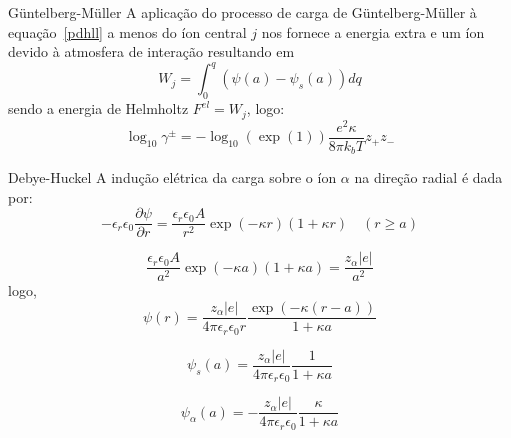 \documentclass{beamer}
\begin{document}
\begin{frame}{G\"{u}ntelberg-M\"{u}ller}
	  A aplicação do processo de carga de G\"{u}ntelberg-M\"{u}ller à  equação~\ref{pdhll} a menos do íon central $j$
	  nos fornece a energia extra e um íon devido à atmosfera de interação resultando em 
	  \begin{equation}
		  W_j = \int^{q}_{0} (\psi(a)- \psi_s(a))dq
	  \end{equation}
            sendo a energia de Helmholtz  $F^{el} = W_j$, logo: 
	\begin{equation}
		\log_{10} \gamma^{\pm} = -\log_{10}(\exp(1)) \frac{e^2 \kappa }{8 \pi k_b T}z_{+}z_{-}
	\end{equation}

%
\end{frame}

\begin{frame}{Debye-Huckel}
A indução elétrica da carga sobre o íon $\alpha$ na direção radial é dada por:
	\begin{equation}
		-\epsilon_r \epsilon_0 \frac{\partial \psi}{\partial r } =
		 \frac{\epsilon_r \epsilon_0 A}{r^2} \exp(-\kappa r)(1+\kappa r ) \quad (r\geq a )    
	\end{equation}

	\begin{equation}
		\frac{\epsilon_r \epsilon_0 A}{a^2} \exp(-\kappa a)(1+\kappa a )    =   \frac{z_{\alpha}|e|}{a^2}
	\end{equation}
	logo,
	\begin{equation}
		\psi(r) = \frac{z_{\alpha}|e|}{4\pi \epsilon_r \epsilon_0 r }\frac{\exp(-\kappa (r-a))}{1+\kappa a } 
        \end{equation}

	\begin{equation}
		\psi_s(a) = \frac{z_{\alpha}|e|}{4\pi \epsilon_r \epsilon_0}\frac{1}{1+\kappa a } 
        \end{equation}

        \begin{equation}
		\psi_{\alpha}(a) = -\frac{z_{\alpha}|e|}{4\pi \epsilon_r \epsilon_0}\frac{\kappa}{1+\kappa a } 
        \end{equation}
\end{frame}
\end{document}
